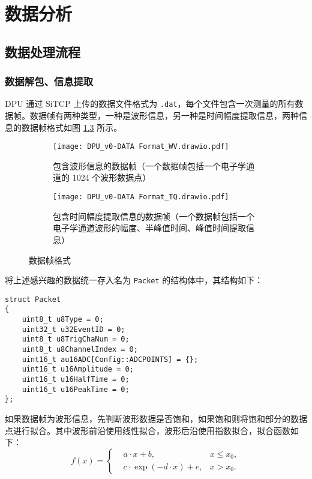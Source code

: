 
\chapter{数据分析}

\section{数据处理流程}

\subsection{数据解包、信息提取}
\label{sec:data_unpack}
DPU 通过 SiTCP 上传的数据文件格式为 \texttt{.dat}，每个文件包含一次测量的所有数据帧。数据帧有两种类型，一种是波形信息，另一种是时间幅度提取信息，两种信息的数据帧格式如图 \ref{fig:data_format} 所示。
\begin{figure}[htbp]
    \centering
    \begin{subfigure}[t]{0.35\textwidth}
        \texttt{[image: DPU\_v0-DATA Format\_WV.drawio.pdf]}
        \caption{包含波形信息的数据帧（一个数据帧包括一个电子学通道的 1024 个波形数据点）}
        \label{fig:data_format_wv}
    \end{subfigure}
    \hfill
    \begin{subfigure}[t]{0.35\textwidth}
        \texttt{[image: DPU\_v0-DATA Format\_TQ.drawio.pdf]}
        \caption{包含时间幅度提取信息的数据帧（一个数据帧包括一个电子学通道波形的幅度、半峰值时间、峰值时间提取信息）}
        \label{fig:data_format_tq}
    \end{subfigure}
    \caption{数据帧格式}
    \label{fig:data_format}
\end{figure}

将上述感兴趣的数据统一存入名为 \verb|Packet| 的结构体中，其结构如下：
\begin{verbatim}
struct Packet
{
    uint8_t u8Type = 0;
    uint32_t u32EventID = 0;
    uint8_t u8TrigChaNum = 0;
    uint8_t u8ChannelIndex = 0;
    uint16_t au16ADC[Config::ADCPOINTS] = {};
    uint16_t u16Amplitude = 0;
    uint16_t u16HalfTime = 0;
    uint16_t u16PeakTime = 0;
};
\end{verbatim}

如果数据帧为波形信息，先判断波形数据是否饱和，如果饱和则将饱和部分的数据点进行拟合。其中波形前沿使用线性拟合，波形后沿使用指数拟合，拟合函数如下：
\begin{equation}
    f(x) = \left\{
    \begin{aligned}
        & a \cdot x + b, & x \leq x_0, \\
        & c \cdot \exp(-d \cdot x) + e, & x > x_0.
    \end{aligned}
    \right.
\end{equation}

